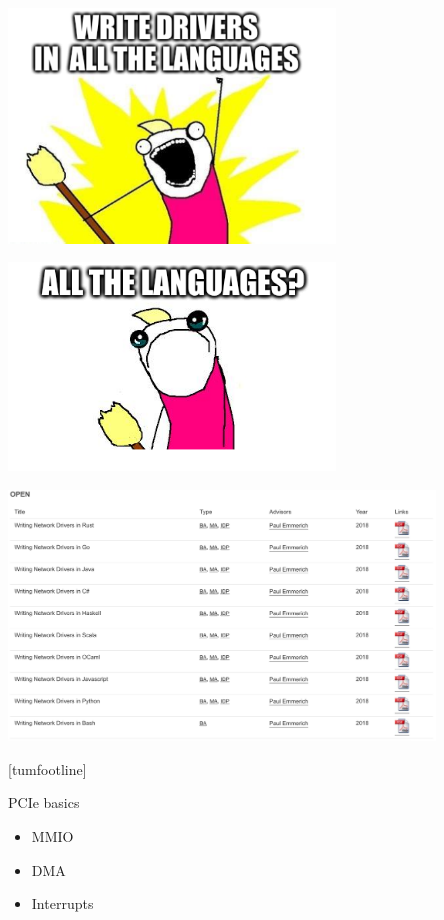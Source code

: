 \documentclass[NET,english,aspectratio=169,notitleframe]{tumbeamer}
\begin{document}
\begin{frame}{}
\centering\includegraphics[width=0.65\textwidth]{pics/allthe1}
\end{frame}

\begin{frame}{}
\centering\includegraphics[width=0.65\textwidth]{pics/allthe2}
\end{frame}

\begin{frame}{}
\centering\includegraphics[width=0.85\textwidth]{pics/theses}
\end{frame}
[tumfootline]


\begin{frame}{PCIe basics}
\begin{itemize}
\item MMIO
\item DMA
\item Interrupts
\end{itemize}
\end{frame}
\end{document}
